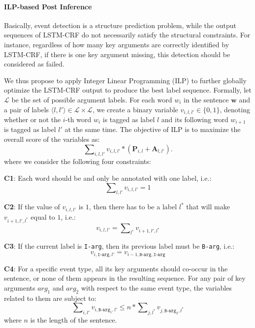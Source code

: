 \vspace{-.8em}
\paragraph{ILP-based Post Inference}
Basically, event detection is a structure prediction problem, while the output sequences of LSTM-CRF do not necessarily satisfy the structural constraints. For instance, regardless of how many key arguments are correctly identified by LSTM-CRF, if there is one key argument missing, this detection should be considered as failed. 

We thus propose to apply Integer Linear Programming (ILP) to further globally optimize the LSTM-CRF output  to produce the best label sequence.
Formally, let $\mathcal{L}$ be the set of possible argument labels. For each word $w_i$ in the sentence $\bm{w}$ and a pair of labels $ \langle l, l' \rangle \in \mathcal{L} \times \mathcal{L}$, we create a binary variable ${v_{i,l,l'} \in \{0, 1\}}$, denoting whether or not the $i$-th word $w_i$ is tagged as label $l$ and its following word $w_{i+1}$ is tagged as label $l'$ at the same time. The objective of ILP is to maximize the overall score of the variables as:
\begin{displaymath}
	\sum\nolimits_{i, l, l'}v_{i,l,l'} * (\textbf{P}_{i,l}+\textbf{A}_{l,l'}) .
\end{displaymath}
where we consider the following four constraints:

\textbf{C1}: Each word should be and only be annotated with one label, i.e.:
\begin{equation}
	\sum\nolimits_{l,l'}v_{i,l,l'}=1
\end{equation}

\textbf{C2}: If the value of $v_{i,l,l'}$ is $1$, then there has to be a label $l^*$ that will make $v_{i+1,l',l^*}$ equal to $1$, i.e.:
\begin{equation}
	v_{i,l,l'} = \sum\nolimits_{l^*}v_{i+1,l',l^*}
\end{equation}

\textbf{C3}: If the current label is \texttt{I-arg}, then its previous label must be \texttt{B-arg}, i.e.:
\begin{equation}
	v_{i,\texttt{I-arg},l'} = v_{i-1,\texttt{B-arg},\texttt{I-arg}}
\end{equation}

\textbf{C4}: For a specific event type, all its key arguments should co-occur in the sentence, or none of them appears in the resulting sequence. For any pair of key arguments $arg_1$ and $arg_2$ with respect to the same event type, the variables related to them are subject to:
\begin{equation}
	\sum\nolimits_{i,l'}{v_{i,\texttt{B-arg}_1,l'}} \leq n * \sum\nolimits_{j,l^*}{v_{j,\texttt{B-arg}_2,l^*}}
\end{equation}
where $n$ is the length of the sentence.

